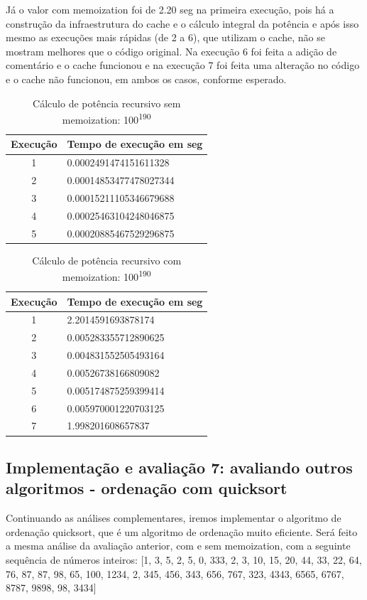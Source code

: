 \documentclass[sigconf]{acmart}
\begin{document}
Já o valor com memoization foi de 2.20 seg na primeira execução, pois há a construção da infraestrutura do cache e o cálculo integral da potência e após isso mesmo as execuções mais rápidas (de 2 a 6), que utilizam o cache, não se mostram melhores que o código original. Na execução 6 foi feita a adição de comentário e o cache funcionou e na execução 7 foi feita uma alteração no código e o cache não funcionou, em ambos os casos, conforme esperado.
\begin{table}[H]
  \caption{Cálculo de potência recursivo sem memoization: 100\textsuperscript{190}}
  \label{tab:potrscache}
  \begin{tabular}{cl}
    \toprule
    Execução & Tempo de execução em seg\\
    \midrule
    1 & 0.0002491474151611328\\
    2 & 0.00014853477478027344\\
    3 & 0.00015211105346679688\\
    4 & 0.00025463104248046875\\
    5 & 0.00020885467529296875\\
  \bottomrule
\end{tabular}
\end{table}

\begin{table}[H]
  \caption{Cálculo de potência recursivo com memoization: 100\textsuperscript{190}}
  \label{tab:potrccache}
  \begin{tabular}{cl}
    \toprule
    Execução & Tempo de execução em seg\\
    \midrule
    1 & 2.2014591693878174\\
    2 & 0.005283355712890625\\
    3 & 0.004831552505493164\\
    4 & 0.00526738166809082\\
    5 & 0.005174875259399414\\
    6 & 0.005970001220703125\\
    7 & 1.998201608657837\\
  \bottomrule
\end{tabular}
\end{table}

\subsection{Implementação e avaliação 7: avaliando outros algoritmos - ordenação com quicksort}
Continuando as análises complementares, iremos implementar o algoritmo de ordenação quicksort, que é um algoritmo de ordenação muito eficiente. Será feito a mesma análise da avaliação anterior, com e sem memoization, com a seguinte sequência de números inteiros: [1, 3, 5, 2, 5, 0, 333, 2, 3, 10, 15, 20, 44, 33, 22, 64, 76, 87, 87, 98, 65, 100, 1234, 2, 345, 456, 343, 656, 767, 323, 4343, 6565, 6767, 8787, 9898, 98, 3434]
\end{document}
